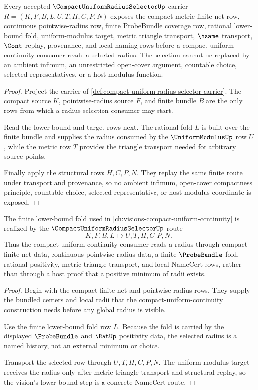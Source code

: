 \begin{theorem}
\label{thm:compact-uniform-radius-selector-namecert-obligations}
Every accepted $\CompactUniformRadiusSelectorUp$ carrier $R=(K,F,B,L,U,T,H,C,P,N)$ exposes the compact metric finite-net row, continuous pointwise-radius row, finite ProbeBundle coverage row, rational lower-bound fold, uniform-modulus target, metric triangle transport, $\hsame$ transport, $\Cont$ replay, provenance, and local naming rows before a compact-uniform-continuity consumer reads a selected radius. The selection cannot be replaced by an ambient infimum, an unrestricted open-cover argument, countable choice, selected representatives, or a host modulus function.
\end{theorem}
\begin{proof}
Project the carrier of \autoref{def:compact-uniform-radius-selector-carrier}. The compact source $K$, pointwise-radius source $F$, and finite bundle $B$ are the only rows from which a radius-selection consumer may start.

Read the lower-bound and target rows next. The rational fold $L$ is built over the finite bundle and supplies the radius consumed by the $\UniformModulusUp$ row $U$, while the metric row $T$ provides the triangle transport needed for arbitrary source points.

Finally apply the structural rows $H,C,P,N$. They replay the same finite route under transport and provenance, so no ambient infimum, open-cover compactness principle, countable choice, selected representative, or host modulus coordinate is exposed.
\end{proof}

\begin{theorem}
\label{thm:compact-uniform-radius-selector-vision-handoff}
The finite lower-bound fold used in \autoref{ch:visions-compact-uniform-continuity} is realized by the $\CompactUniformRadiusSelectorUp$ route
$$
K,F,B,L \longmapsto U,T,H,C,P,N .
$$
Thus the compact-uniform-continuity consumer reads a radius through compact finite-net data, continuous pointwise-radius data, a finite $\ProbeBundle$ fold, rational positivity, metric triangle transport, and local NameCert rows, rather than through a host proof that a positive minimum of radii exists.
\end{theorem}
\begin{proof}
Begin with the compact finite-net and pointwise-radius rows. They supply the bundled centers and local radii that the compact-uniform-continuity construction needs before any global radius is visible.

Use the finite lower-bound fold row $L$. Because the fold is carried by the displayed $\ProbeBundle$ and $\RatUp$ positivity data, the selected radius is a named history, not an external minimum or choice.

Transport the selected row through $U,T,H,C,P,N$. The uniform-modulus target receives the radius only after metric triangle transport and structural replay, so the vision's lower-bound step is a concrete NameCert route.
\end{proof}

